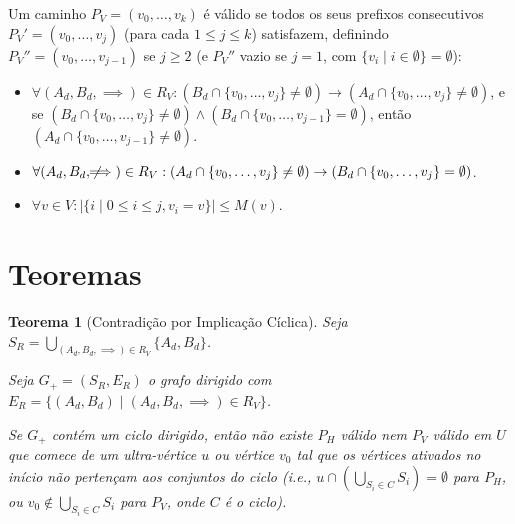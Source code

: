 \documentclass{article}
\newtheorem{theorem}{Teorema}
\begin{document}
Um caminho \( P_V = (v_0, \dots, v_k) \) é válido se todos os seus prefixos consecutivos \( P_V' = (v_0, \dots, v_j) \) (para cada \( 1 \leq j \leq k \)) satisfazem, definindo \( P_V'' = (v_0, \dots, v_{j-1}) \) se \( j \geq 2 \) (e \( P_V'' \) vazio se \( j = 1 \), com \( \{v_i \mid i \in \emptyset \} = \emptyset \)):

\begin{itemize}
    \item \( \forall (A_d, B_d, \implies) \in R_V: (B_d \cap \{v_0, \dots, v_j\} \neq \emptyset) \to (A_d \cap \{v_0, \dots, v_j\} \neq \emptyset) \), e se \( (B_d \cap \{v_0, \dots, v_j\} \neq \emptyset) \wedge (B_d \cap \{v_0, \dots, v_{j-1}\} = \emptyset) \), então \( (A_d \cap \{v_0, \dots, v_{j-1}\} \neq \emptyset) \).
    \item \( \forall (A_d, B_d, \not\!\!\!\implies) \in R_V: (A_d \cap \{v_0, \dots, v_j\} \neq \emptyset) \to (B_d \cap \{v_0, \dots, v_j\} = \emptyset) \).
    \item \( \forall v \in V: |\{ i \mid 0 \leq i \leq j, v_i = v \}| \leq M(v) \).
\end{itemize}

\section{Teoremas}

\begin{theorem}[Contradição por Implicação Cíclica]
\hfill
Seja \( S_R = \bigcup_{(A_d, B_d, \implies) \in R_V} \{ A_d, B_d \} \).

Seja \( G_{+} = (S_R, E_R) \) o grafo dirigido com \( E_R = \{ (A_d, B_d) \mid (A_d, B_d, \implies) \in R_V \} \).

Se \( G_{+} \) contém um ciclo dirigido, então não existe \( P_H \) válido nem \( P_V \) válido em \( U \) que comece de um ultra-vértice \( u \) ou vértice \( v_0 \) tal que os vértices ativados no início não pertençam aos conjuntos do ciclo (i.e., \( u \cap \left( \bigcup_{S_i \in C} S_i \right) = \emptyset \) para \( P_H \), ou \( v_0 \notin \bigcup_{S_i \in C} S_i \) para \( P_V \), onde \( C \) é o ciclo).
\end{theorem}
\end{document}
